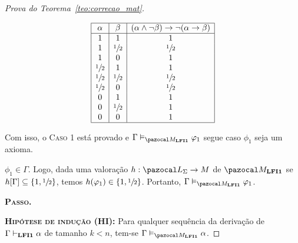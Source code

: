 \begin{proof}[Prova do Teorema~\ref{teo:correcao_mat}]
\begin{provaporcasos}
\begin{provaporsubcasos}
                    \begin{center}
                        \[
                            \begin{array}{|c|c|c|}%
                                \hline%
                                \alpha      & \beta & (\alpha \land \neg \beta) \to \neg(\alpha \to \beta) \\
                                \hline%
                                1 & 1 & 1\\
                                1 & \meio{} & \meio{}\\
                                1 & 0 & 1\\
                                \meio{} & 1 & 1\\
                                \meio{} & \meio{} &\meio{}\\ 
                                \meio{} & 0 & \meio{}\\
                                0 & 1 & 1\\
                                0 & \meio{} & 1\\
                                0 & 0 & 1\\
                                \hline%
                            \end{array}
                        \]
                    \end{center}
                    
                \end{provaporsubcasos}

                Com isso, o \textsc{Caso 1} está provado e $\Gamma \conmat \phi_{1}$ segue caso $\phi_{1}$ seja um axioma.

                \casodeprova{} $\phi_{1} \in \Gamma$. Logo, dada uma valoração $h : \ling{} \to M$ de $\mat{}$ se $h[\Gamma] \subseteq \{1, \sfrac{1}{2}{}\}$, temos $h(\varphi_{1}) \in \{1, \sfrac{1}{2}{}\}$. Portanto, $\Gamma \conmat \phi_{1}$.

            \end{provaporcasos}

            \noindent \textbf{\textsc{Passo.}}
            
            \noindent \textbf{\textsc{Hipótese de indução (HI):}} Para qualquer sequência da derivação de $\Gamma \vdash_{{\normalfont\textbf{LFI1}}{}} \alpha$ de tamanho $k < n$, tem-se $\Gamma \conmat \alpha$. 
            

\end{proof}
